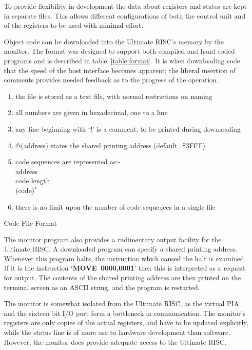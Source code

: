To provide flexibility in development  the  data about registers and states are kept in separate files. 
This allows different configurations of both the control unit and of the registers to  be used with minimal effort.


Object code can be downloaded into the Ultimate RISC's memory by the monitor.
The format was designed to support both  compiled and hand coded programs
and is described in table~\ref{table:format}.
It is when downloading code that the speed of the host interface becomes apparent;
the liberal insertion of comments  provides needed feedback as to the progress of the  operation.

\begin{table}
\begin{enumerate}
\item the file is stored as a text file, with normal restrictions on naming
\item all numbers are given in hexadecimal, one to a line
\item any line beginning with `{\bf !}' is a comment, to be printed during
downloading
\item @(address) states the shared printing address (default=\$3FFF)
\item code sequences are represented as:-\\
address\\
code length\\
(code)$^{*}$
\item there is no limit upon the number of code sequences in a single file
\end{enumerate}
\caption{Code File Format}
\label{table:format}
\end{table}

The monitor program also provides a rudimentary output facility for the Ultimate RISC.
A downloaded program can specify a shared printing address.
Whenever this program halts, the instruction which caused the halt is examined.
If it is the instruction `{\bf MOVE~0000,0001}' then this is interpreted as a request for output.
The contents of the shared printing address are then printed on the terminal screen as an ASCII string, and the program is restarted.


The monitor is  somewhat isolated from the Ultimate RISC,
as the virtual PIA and the sixteen bit I/O port form a bottleneck in communication.
The monitor's registers  are only copies of the actual registers, and have to be updated explicitly, while
the status line is of more use to hardware development than  software.
However, the monitor does provide  adequate access to the Ultimate RISC.


